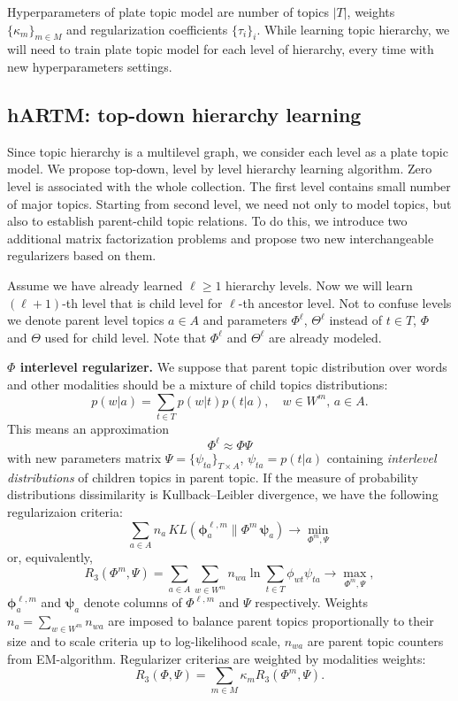 \documentclass[12pt, twoside]{article}
\begin{document}
\vspace{0.5cm}
Hyperparameters of plate topic model are number of topics $|T|$, weights $\{\kappa_m\}_{m \in M}$ and regularization coefficients $\{\tau_i\}_{i}$. While learning topic hierarchy, we will need to train plate topic model for each level of hierarchy, every time with new hyperparameters settings.

\subsection{hARTM: top-down hierarchy learning}
Since topic hierarchy is a multilevel graph, we consider each level as a plate topic model. We propose top-down, level by level hierarchy learning algorithm. Zero level is associated with the whole collection. The first level contains small number of major topics. Starting from second level, we need not only to model topics, but also to establish parent-child topic relations. To do this, we introduce two additional matrix factorization problems and propose two new interchangeable regularizers based on them. 

Assume we have already learned $\ell \geqslant 1$ hierarchy levels. Now we will learn $(\ell+1)$-th level that is child level for $\ell$-th ancestor level. Not to confuse levels we denote parent level topics $a \in A$ and parameters $\Phi^\ell$, $\Theta^\ell$ instead of $t \in T$, $\Phi$ and $\Theta$ used for child level. Note that $\Phi^\ell$ and $\Theta^\ell$ are already modeled.

\textbf{$\Phi$ interlevel regularizer.}
We suppose that parent topic distribution over words and other modalities should be a mixture of child topics distributions:
\[
p(w|a) = \sum_{t \in T} p(w|t) p(t|a), \quad w \in W^m, \, a \in A.
\] 
This means an approximation 
\begin{equation}
\label{phi_approximation}
\Phi^\ell \approx \Phi \Psi
\end{equation}
 with new parameters matrix $\Psi = \{\psi_{ta}\}_{T \times A}$, $\psi_{ta} = p(t|a)$ containing \emph{interlevel distributions} of children topics in parent topic. If the measure of probability distributions dissimilarity is Kullback–Leibler divergence, we have the following regularizaion criteria:
\begin{equation}
\label{phi_regularizer}
\nonumber
 \sum_{a \in A} n_a \, KL(\bm \phi^{\ell, m}_a \| \Phi^m \, \bm \psi_a)  \rightarrow \min_{\Phi^m, \Psi}
\end{equation}
or, equivalently,
\[
R_3(\Phi^m, \Psi) = \sum_{a \in A} \sum_{w \in W^m} n_{wa} \ln \sum_{t \in T} \phi_{wt} \psi_{ta} \rightarrow \max_{\Phi^m, \Psi},
\]
$\bm \phi^{\ell, m}_a$ and $\bm \psi_a$ denote columns of $\Phi^{\ell, m}$ and $\Psi$ respectively. Weights $n_a = \sum_{w \in W^m} n_{wa}$ are imposed to balance parent topics proportionally to their size and to scale criteria up to log-likelihood scale, $n_{wa}$ are parent topic counters from EM-algorithm.
Regularizer criterias are weighted by modalities weights: 
\[
R_3(\Phi, \Psi) = \sum_{m \in M} \kappa_m R_3(\Phi^m, \Psi).
\]
\end{document}
